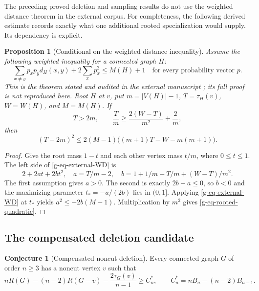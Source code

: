\documentclass[11pt,a4paper]{article}
\newtheorem{proposition}[theorem]{Proposition}
\theoremstyle{definition}
\newtheorem{conjecture}[theorem]{Conjecture}
\theoremstyle{remark}
\begin{document}
The preceding proved deletion and sampling results do not use the weighted
distance theorem in the external corpus.  For completeness, the following
derived estimate records exactly what one additional rooted specialization
would supply.  Its dependency is explicit.

\begin{proposition}[Conditional on the weighted distance inequality]
\label{g-prop-rooted-weighted}
Assume the following weighted inequality for a connected graph $H$:
\begin{equation}
 \sum_{x\ne y}p_xp_y d_H(x,y)+2\sum_xp_x^2\le M(H)+1
 \quad\text{for every probability vector }p.
 \label{g-eq-external-WD}
\end{equation}
This is the theorem stated and audited in the external manuscript
\cite{g-VMRC227}; its full proof is not reproduced here.
Root $H$ at $v$, put $m=|V(H)|-1$, $T=\tau_H(v)$, $W=W(H)$,
and $M=M(H)$.  If
\[
 T>2m,\qquad
 \frac Tm\ge\frac{2(W-T)}{m^2}+\frac2m,
\]
then
\begin{equation}
 (T-2m)^2\le
 2(M-1)\bigl((m+1)T-W-m(m+1)\bigr).
 \label{g-eq-rooted-quadratic}
\end{equation}
\end{proposition}

\begin{proof}
Give the root mass $1-t$ and each other vertex mass $t/m$, where
$0\le t\le1$.  The left side of \eqref{g-eq-external-WD} is
\[
 2+2at+2bt^2,
 \quad
 a=T/m-2,
 \quad
 b=1+1/m-T/m+(W-T)/m^2.
\]
The first assumption gives $a>0$.  The second is exactly $2b+a\le0$,
so $b<0$ and the maximizing parameter $t_*=-a/(2b)$ lies in $(0,1]$.
Applying \eqref{g-eq-external-WD} at $t_*$ yields
$a^2\le-2b(M-1)$.  Multiplication by $m^2$ gives
\eqref{g-eq-rooted-quadratic}.
\end{proof}

\subsection{The compensated deletion candidate}
\label{g-sub-CD}

\begin{conjecture}[Compensated noncut deletion]
\label{g-conj-CD}
Every connected graph $G$ of order $n\ge3$ has a noncut vertex $v$ such
that
\begin{equation}
 nR(G)-(n-2)R(G-v)-\frac{2\tau_G(v)}{n-1}
 \ge C_n^*,\qquad
 C_n^*=nB_n-(n-2)B_{n-1}.
 \label{g-eq-CD}
\end{equation}
\end{conjecture}
\end{document}
